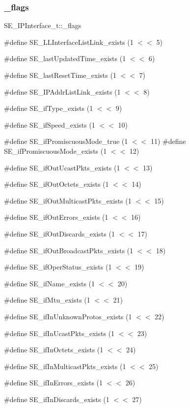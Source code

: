 \subsubsection{\texorpdfstring{\+\_\+flags}{\_flags}}
{\footnotesize\ttfamily S\+E\+\_\+\+I\+P\+Interface\+\_\+t\+::\+\_\+flags}

\#define S\+E\+\_\+\+L\+L\+Interface\+List\+Link\+\_\+exists (1 $<$$<$ 5)

\#define S\+E\+\_\+last\+Updated\+Time\+\_\+exists (1 $<$$<$ 6)

\#define S\+E\+\_\+last\+Reset\+Time\+\_\+exists (1 $<$$<$ 7)

\#define S\+E\+\_\+\+I\+P\+Addr\+List\+Link\+\_\+exists (1 $<$$<$ 8)

\#define S\+E\+\_\+if\+Type\+\_\+exists (1 $<$$<$ 9)

\#define S\+E\+\_\+if\+Speed\+\_\+exists (1 $<$$<$ 10)

\#define S\+E\+\_\+if\+Promiscuous\+Mode\+\_\+true (1 $<$$<$ 11) \#define S\+E\+\_\+if\+Promiscuous\+Mode\+\_\+exists (1 $<$$<$ 12)

\#define S\+E\+\_\+if\+Out\+Ucast\+Pkts\+\_\+exists (1 $<$$<$ 13)

\#define S\+E\+\_\+if\+Out\+Octets\+\_\+exists (1 $<$$<$ 14)

\#define S\+E\+\_\+if\+Out\+Multicast\+Pkts\+\_\+exists (1 $<$$<$ 15)

\#define S\+E\+\_\+if\+Out\+Errors\+\_\+exists (1 $<$$<$ 16)

\#define S\+E\+\_\+if\+Out\+Discards\+\_\+exists (1 $<$$<$ 17)

\#define S\+E\+\_\+if\+Out\+Broadcast\+Pkts\+\_\+exists (1 $<$$<$ 18)

\#define S\+E\+\_\+if\+Oper\+Status\+\_\+exists (1 $<$$<$ 19)

\#define S\+E\+\_\+if\+Name\+\_\+exists (1 $<$$<$ 20)

\#define S\+E\+\_\+if\+Mtu\+\_\+exists (1 $<$$<$ 21)

\#define S\+E\+\_\+if\+In\+Unknown\+Protos\+\_\+exists (1 $<$$<$ 22)

\#define S\+E\+\_\+if\+In\+Ucast\+Pkts\+\_\+exists (1 $<$$<$ 23)

\#define S\+E\+\_\+if\+In\+Octets\+\_\+exists (1 $<$$<$ 24)

\#define S\+E\+\_\+if\+In\+Multicast\+Pkts\+\_\+exists (1 $<$$<$ 25)

\#define S\+E\+\_\+if\+In\+Errors\+\_\+exists (1 $<$$<$ 26)

\#define S\+E\+\_\+if\+In\+Discards\+\_\+exists (1 $<$$<$ 27)

